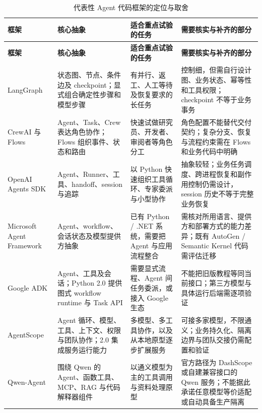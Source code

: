 \documentclass[11pt,a4paper]{article}
\begin{document}
\begingroup
\small
\renewcommand{\arraystretch}{1.16}
\setlength{\tabcolsep}{4pt}
\begin{longtable}{P{2.7cm}P{3.7cm}P{3.15cm}P{5.15cm}}
\caption{代表性 Agent 代码框架的定位与取舍}\label{tab:agent-frameworks}\\
\toprule
{}\color{white}\textbf{框架} & \color{white}\textbf{核心抽象} & \color{white}\textbf{适合重点试验的任务} & \color{white}\textbf{需要核实与补齐的部分}\\
\midrule
\endfirsthead
\toprule
{}\color{white}\textbf{框架} & \color{white}\textbf{核心抽象} & \color{white}\textbf{适合重点试验的任务} & \color{white}\textbf{需要核实与补齐的部分}\\
\midrule
\endhead
\bottomrule
\endfoot
LangGraph\newline\cite{langgraph-persist,langgraph-overview} & 状态图、节点、条件边及 checkpoint；显式组合确定性步骤和模型步骤 & 有并行、返工、人工等待及恢复要求的长任务 & 控制细，但需自行设计图、业务状态、幂等性和工具权限；checkpoint 不等于业务事务\\
CrewAI 与 Flows\newline\cite{crewai-flows} & Agent、Task、Crew 表达角色协作；Flows 组织事件、状态和路由 & 快速试做研究员、开发者、审阅者等角色分工 & 角色配置不能替代交付契约；复杂分支、恢复与流程约束需在 Flows 和业务代码中明确\\
OpenAI Agents SDK\newline\cite{agents-sdk} & Agent、Runner、工具、handoff、session 与追踪 & 以 Python 快速组织工具循环、专家委派与小型协作 & 抽象较轻；业务任务调度、跨进程恢复和副作用控制仍需设计，session 历史不等于完整业务恢复\\
Microsoft Agent Framework\newline\cite{microsoft-agent} & Agent、workflow、会话状态及模型提供方抽象 & 已有 Python / .NET 系统，需要把 Agent 与应用流程整合 & 需核对所用语言、提供方和部署方式的能力差异；既有 AutoGen / Semantic Kernel 代码需评估迁移\\
Google ADK\newline\cite{google-adk} & Agent、工具及会话；Python 2.0 提供图式 workflow runtime 与 Task API & 需要显式流程、Agent 间任务委派，或接入 Google 生态 & 不能把旧版教程等同当前接口；第三方模型与具体运行后端需逐项验证\\
AgentScope\newline\cite{agentscope} & Agent 循环、模型、工具、上下文、权限与团队协作；2.0 集成服务运行能力 & 多模型、多工具协作，以及从本地原型逐步扩展服务 & 可接多家模型，不限通义；业务持久化、隔离边界与团队交接仍需配置和验证\\
\mbox{Qwen-Agent}\newline\cite{qwen-agent} & 围绕 Qwen 的 Agent、函数工具、MCP、RAG 与代码解释器组件 & 以通义模型为主的工具调用与资料处理原型 & 官方路径为 DashScope 或自建兼容接口的 Qwen 服务；不能据此承诺任意模型等价适配或自动具备生产隔离\\
\end{longtable}
\endgroup
\end{document}
